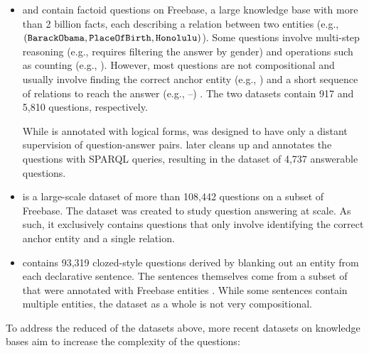 \begin{itemize}
\item {} \cite{cai2013large}
and
 \cite{berant2013freebase}
contain factoid questions on Freebase,
a large knowledge base with more than 2 billion facts,
each describing a relation between two entities
(e.g., $(\texttt{BarackObama},\texttt{PlaceOfBirth},\texttt{Honolulu})$).
Some questions involve multi-step reasoning
(e.g., 
requires filtering the answer by gender)
and operations such as counting
(e.g., ).
However,
most questions are not compositional and
usually involve finding the correct anchor entity
(e.g., )
and a short sequence of relations to reach the answer
(e.g., --)
\cite{yao2014ie}.
The two datasets contain
917 and 5,810 questions, respectively.

While  is annotated with logical forms,
 was designed to have only
a distant supervision
of question-answer pairs.
\citet{yih2016value} later cleans up
and annotates the questions with SPARQL queries,
resulting in the  dataset
of 4,737 answerable questions.

\item {} \cite{bordes2015simple}
is a large-scale dataset of more than 108,442 questions
on a subset of Freebase. The dataset was created to study
question answering at scale. As such, it exclusively contains
questions that only involve
identifying the correct anchor entity
and a single relation.

\item {} \cite{bisk2016evaluating}
contains 93,319 clozed-style questions
derived by blanking out an entity from
each declarative sentence.
The sentences themselves come from
a subset of 
that were annotated with Freebase entities \cite{gabrilovich2013facc1}.
While some sentences contain multiple entities,
the dataset as a whole is not very compositional.

\end{itemize}

To address the reduced \Depth of the datasets above,
more recent datasets on knowledge bases aim to increase
the complexity of the questions:

